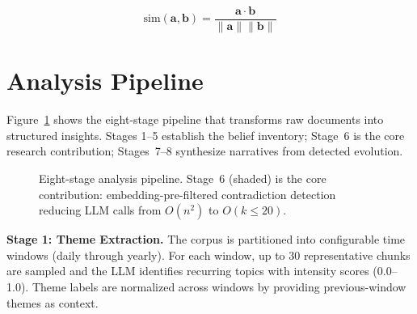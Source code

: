 \documentclass[conference]{IEEEtran}
\begin{document}
\begin{equation}
\text{sim}(\mathbf{a}, \mathbf{b}) = \frac{\mathbf{a} \cdot \mathbf{b}}{\|\mathbf{a}\| \|\mathbf{b}\|}
\label{eq:cosine}
\end{equation}

\section{Analysis Pipeline}
\label{sec:pipeline}

Figure~\ref{fig:pipeline} shows the eight-stage pipeline that transforms raw documents into structured insights. Stages 1--5 establish the belief inventory; Stage~6 is the core research contribution; Stages~7--8 synthesize narratives from detected evolution.

\begin{figure}[t]
\centering
{}
\caption{Eight-stage analysis pipeline. Stage~6 (shaded) is the core contribution: embedding-pre-filtered contradiction detection reducing LLM calls from $O(n^2)$ to $O(k \leq 20)$.}
\label{fig:pipeline}
\end{figure}

\textbf{Stage 1: Theme Extraction.} The corpus is partitioned into configurable time windows (daily through yearly). For each window, up to 30 representative chunks are sampled and the LLM identifies recurring topics with intensity scores (0.0--1.0). Theme labels are normalized across windows by providing previous-window themes as context.
\end{document}
